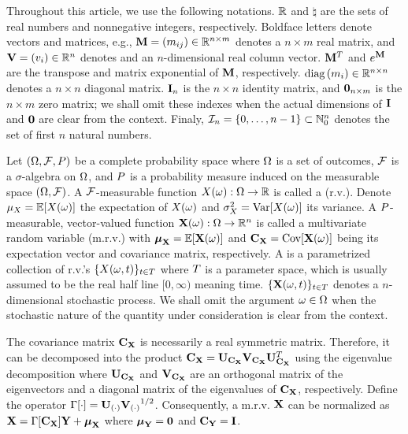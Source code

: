 Throughout this article, we use the following notations. $\mathbb{R}$ and $\natural$ are the sets of real numbers and nonnegative integers, respectively. Boldface letters denote vectors and matrices, e.g., $\m{M} = \mtx{m_{ij}} \in \real^{n \times m}$ denotes a $n \times m$ real matrix, and $\mathbf{V} = (v_i) \in \mathbb{R}^n$ denotes and an $n$-dimensional real column vector. $\m{M}^T$ and $e^\m{M}$ are the transpose and matrix exponential of $\m{M}$, respectively. $\text{diag}\left(m_i\right) \in \mathbb{R}^{n \times n}$ denotes a $n \times n$ diagonal matrix. $\mI_n$ is the $n \times n$ identity matrix, and $\mZ_{n \times m}$ is the $n \times m$ zero matrix; we shall omit these indexes when the actual dimensions of $\mI$ and $\mZ$ are clear from the context. Finaly, $\mathcal{I}_n = \{ 0, \dots, n - 1 \} \subset \mathbb{N}_0^n$ denotes the set of first $n$ natural numbers.

Let $(\Omega, \mathcal{F}, P)$ be a complete probability space \cite{durrett2010} where $\Omega$ is a set of outcomes, $\mathcal{F}$ is a $\sigma$-algebra on $\Omega$, and $P$ is a probability measure induced on the measurable space $(\Omega, \mathcal{F})$. A $\mathcal{F}$-measurable function $\rv{x}(\o): \outcomes \to \real$ is called a  (r.v.). Denote $\exp_\rv{x} = \oExp{\rv{x}(\o)}$ the expectation of $\rv{x}(\o)$ and $\var_\rv{x} = \oVar{\rv{x}(\o)}$ its variance. A $P$-measurable, vector-valued function $\mrv{x}(\o): \outcomes \to \real^n$ is called a multivariate random variable (m.r.v.) with $\vExp_\mrv{x} = \oExp{\mrv{x}(\o)}$ and $\mCov_\mrv{x} = \oCov{\mrv{x}(\o)}$ being its expectation vector and covariance matrix, respectively. A  is a parametrized collection of r.v.'s $\{ \rv{x}(\o, \t) \}_{\t \in \sTime}$ where $T$ is a parameter space, which is usually assumed to be the real half line $[0, \infty)$ meaning time. $\{ \mrv{x}(\o, \t) \}_{\t \in \sTime}$ denotes a $n$-dimensional stochastic process. We shall omit the argument $\omega \in \Omega$ when the stochastic nature of the quantity under consideration is clear from the context.

The covariance matrix $\mCov_\mrv{x}$ is necessarily a real symmetric matrix. Therefore, it can be decomposed into the product $\mCov_\mrv{x} = \m{U}_{\mCov_\mrv{x}} \m{V}_{\mCov_\mrv{x}} \m{U}_{\mCov_\mrv{x}}^T$ using the eigenvalue decomposition \cite{press2007} where $\m{U}_{\mCov_\mrv{x}}$ and $\m{V}_{\mCov_\mrv{x}}$ are an orthogonal matrix of the eigenvectors and a diagonal matrix of the eigenvalues of $\mCov_\mrv{x}$, respectively. Define the operator $\oEigen{\cd} = \m{U}_{(\cd)} {\m{V}_{(\cd)}}^{1/2}$. Consequently, a m.r.v. $\mrv{x}$ can be normalized as $\mrv{x} = \oEigen{\mCov_\mrv{x}} \mrv{y} + \vExp_\mrv{x}$ where $\vExp_\mrv{y} = \mZ$ and $\mCov_\mrv{y} = \mI$.
